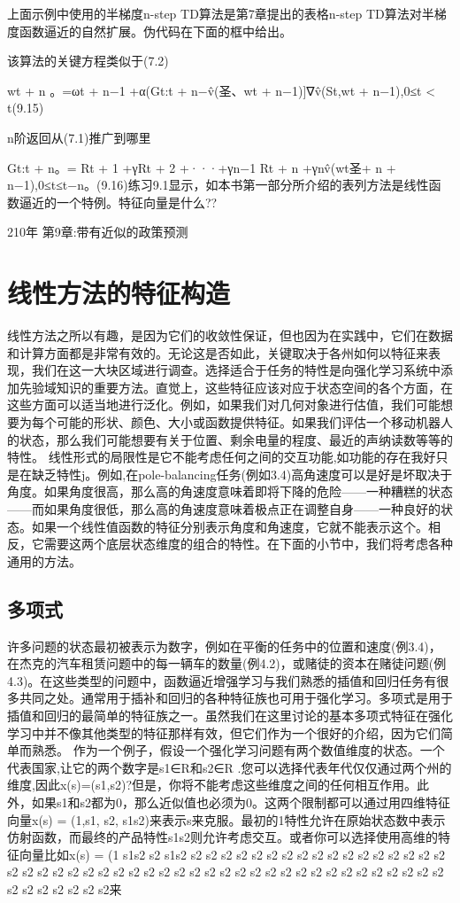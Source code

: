 上面示例中使用的半梯度n-step TD算法是第7章提出的表格n-step TD算法对半梯度函数逼近的自然扩展。伪代码在下面的框中给出。
 

该算法的关键方程类似于(7.2)

wt + n
。=ωt + n−1 +α(Gt:t + n−v̂(圣、wt + n−1)]∇v̂(St,wt + n−1),0≤t < t(9.15)

n阶返回从(7.1)推广到哪里

Gt:t + n。= Rt + 1 +γRt + 2 +···+γn−1 Rt + n +γnv̂(wt圣+ n + n−1),0≤t≤t−n。(9.16)练习9.1显示，如本书第一部分所介绍的表列方法是线性函数逼近的一个特例。特征向量是什么??

210年 					第9章:带有近似的政策预测


\section{线性方法的特征构造}

线性方法之所以有趣，是因为它们的收敛性保证，但也因为在实践中，它们在数据和计算方面都是非常有效的。无论这是否如此，关键取决于各州如何以特征来表现，我们在这一大块区域进行调查。选择适合于任务的特性是向强化学习系统中添加先验域知识的重要方法。直觉上，这些特征应该对应于状态空间的各个方面，在这些方面可以适当地进行泛化。例如，如果我们对几何对象进行估值，我们可能想要为每个可能的形状、颜色、大小或函数提供特征。如果我们评估一个移动机器人的状态，那么我们可能想要有关于位置、剩余电量的程度、最近的声纳读数等等的特性。
线性形式的局限性是它不能考虑任何之间的交互功能,如功能的存在我好只是在缺乏特性j。例如,在pole-balancing任务(例如3.4)高角速度可以是好是坏取决于角度。如果角度很高，那么高的角速度意味着即将下降的危险——一种糟糕的状态——而如果角度很低，那么高的角速度意味着极点正在调整自身——一种良好的状态。如果一个线性值函数的特征分别表示角度和角速度，它就不能表示这个。相反，它需要这两个底层状态维度的组合的特性。在下面的小节中，我们将考虑各种通用的方法。


\subsection{多项式}
许多问题的状态最初被表示为数字，例如在平衡的任务中的位置和速度(例3.4)，在杰克的汽车租赁问题中的每一辆车的数量(例4.2)，或赌徒的资本在赌徒问题(例4.3)。在这些类型的问题中，函数逼近增强学习与我们熟悉的插值和回归任务有很多共同之处。通常用于插补和回归的各种特征族也可用于强化学习。多项式是用于插值和回归的最简单的特征族之一。虽然我们在这里讨论的基本多项式特征在强化学习中并不像其他类型的特征那样有效，但它们作为一个很好的介绍，因为它们简单而熟悉。
作为一个例子，假设一个强化学习问题有两个数值维度的状态。一个代表国家,让它的两个数字是s1∈R和s2∈R .您可以选择代表年代仅仅通过两个州的维度,因此x(s)=(s1,s2)?但是，你将不能考虑这些维度之间的任何相互作用。此外，如果s1和s2都为0，那么近似值也必须为0。这两个限制都可以通过用四维特征向量x(s) = (1,s1, s2, s1s2)来表示s来克服。最初的1特性允许在原始状态数中表示仿射函数，而最终的产品特性s1s2则允许考虑交互。或者你可以选择使用高维的特征向量比如x(s) = (1 s1s2 s2 s1s2 s2 s2 s2 s2 s2 s2 s2 s2 s2 s2 s2 s2 s2 s2 s2 s2 s2 s2 s2 s2 s2 s2 s2 s2 s2 s2 s2 s2 s2 s2 s2 s2 s2 s2 s2 s2 s2 s2 s2 s2 s2 s2 s2 s2 s2 s2 s2 s2 s2 s2 s2 s2 s2来
